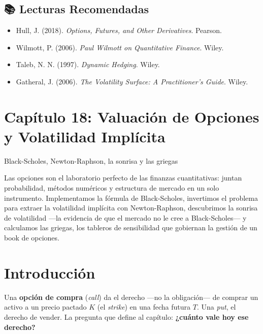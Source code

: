 \documentclass[
  spanish,
  letterpaper,
  DIV=11,
  numbers=noendperiod]{scrreprt}
\providecommand{\tightlist}{%
  \setlength{\itemsep}{0pt}\setlength{\parskip}{0pt}}
\begin{document}
\section*{📚 Lecturas Recomendadas}\label{lecturas-recomendadas-3}


\begin{itemize}
\tightlist
\item
  Hull, J. (2018). \emph{Options, Futures, and Other Derivatives}.
  Pearson.
\item
  Wilmott, P. (2006). \emph{Paul Wilmott on Quantitative Finance}.
  Wiley.
\item
  Taleb, N. N. (1997). \emph{Dynamic Hedging}. Wiley.
\item
  Gatheral, J. (2006). \emph{The Volatility Surface: A Practitioner's
  Guide}. Wiley.
\end{itemize}

\chapter{Capítulo 18: Valuación de Opciones y Volatilidad
Implícita}\label{capuxedtulo-18-valuaciuxf3n-de-opciones-y-volatilidad-impluxedcita}

Black-Scholes, Newton-Raphson, la sonrisa y las griegas

Las opciones son el laboratorio perfecto de las finanzas cuantitativas:
juntan probabilidad, métodos numéricos y estructura de mercado en un
solo instrumento. Implementamos la fórmula de Black-Scholes, invertimos
el problema para extraer la volatilidad implícita con Newton-Raphson,
descubrimos la sonrisa de volatilidad ---la evidencia de que el mercado
no le cree a Black-Scholes--- y calculamos las griegas, los tableros de
sensibilidad que gobiernan la gestión de un book de opciones.

\hfill\break

\chapter{Introducción}\label{introducciuxf3n-15}

Una \textbf{opción de compra} (\emph{call}) da el derecho ---no la
obligación--- de comprar un activo a un precio pactado \(K\) (el
\emph{strike}) en una fecha futura \(T\). Una \emph{put}, el derecho de
vender. La pregunta que define al capítulo: \textbf{¿cuánto vale hoy ese
derecho?}
\end{document}
